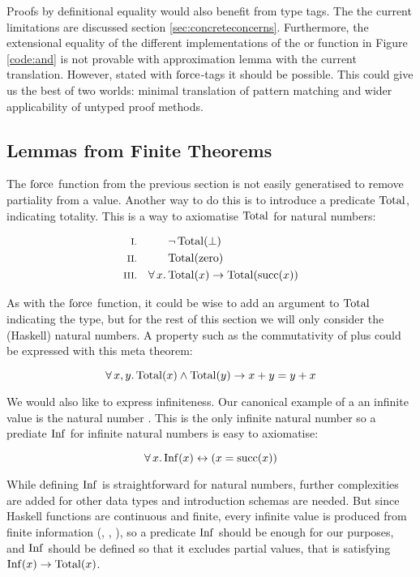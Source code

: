 Proofs by definitional equality would also benefit from type tags. The
the current limitations are discussed section
\ref{sec:concreteconcerns}. Furthermore, the extensional equality of
the different implementations of the or function in Figure
\ref{code:and} is not provable with approximation lemma with the
current translation. However, stated with $\mathrm{force}$-tags it should
be possible. This could give us the best of two worlds: minimal
translation of pattern matching and wider applicability of untyped
proof methods.

\subsection{Lemmas from Finite Theorems}

\newcommand\Inf{\fn{Inf}}
\newcommand\Total{\fn{Total}}
\newcommand\Fin{\fn{Fin}}
The $\mathrm{force}$ function from the previous section is not easily
generatised to remove partiality from a value. Another way to do this
is to introduce a predicate $\Total$, indicating totality. This is a
way to axiomatise $\Total$ for natural numbers:

\begin{align*}
\rom{1} &&        & \neg \, \Total(\bot) \\
\rom{2} &&        & \Total(\fn{zero}) \\
\rom{3} && \fa{x} & \Total(x) \rightarrow \Total(\fn{succ}(x))
\end{align*}

As with the $\mathrm{force}$ function, it could be wise to add an argument
to $\Total$ indicating the type, but for the rest of this section we
will only consider the (Haskell) natural numbers. A property such as the
commutativity of plus could be expressed with this meta theorem:

\begin{equation*}
\faa{x}{y} \Total(x) \wedge \Total(y) \rightarrow x + y = y + x
\end{equation*}

We would also like to express infiniteness. Our canonical example of a
an infinite value is the natural number . This is
the only infinite natural number so a prediate $\Inf$ for infinite
natural numbers is easy to axiomatise:

\begin{equation*}
\fa{x} \Inf(x) \leftrightarrow (x = \fn{succ}(x))
\end{equation*}

While defining $\Inf$ is straightforward for natural numbers, further
complexities are added for other data types and introduction schemas
are needed. But since Haskell functions are continuous and finite,
every infinite value is produced from finite information (,
, ), so a predicate $\Inf$ should be enough
for our purposes, and $\Inf$ should be defined so that it excludes
partial values, that is satisfying $\Inf(x) \rightarrow \Total(x)$.

